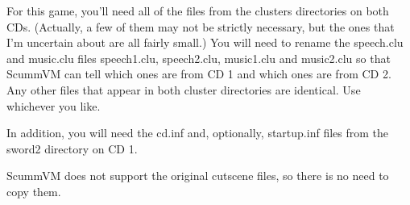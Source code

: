 For this game, you'll need all of the files from the clusters directories on
both CDs. (Actually, a few of them may not be strictly necessary, but the ones
that I'm uncertain about are all fairly small.) You will need to rename the
speech.clu and music.clu files speech1.clu, speech2.clu, music1.clu and
music2.clu so that ScummVM can tell which ones are from CD 1 and which ones are
from CD 2. Any other files that appear in both cluster directories are
identical. Use whichever you like.

In addition, you will need the cd.inf and, optionally, startup.inf files from
the sword2 directory on CD 1.

ScummVM does not support the original cutscene files, so there is no need to
copy them.


